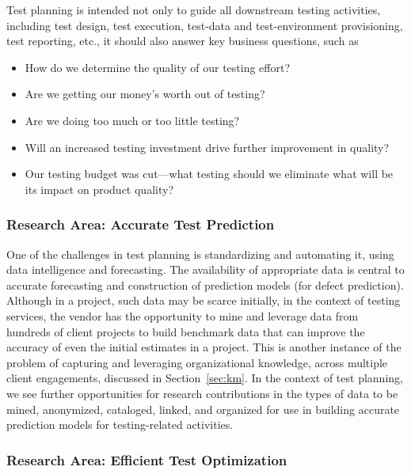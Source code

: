 Test planning is intended not only to guide all downstream testing activities,
including test design, test execution, test-data and test-environment
provisioning, test reporting, etc., it should also answer key business
questions, such as~\cite{Kagan:NextGenTesting}

\begin{itemize}
\denseitems

\item How do we determine the quality of our testing effort?

\item Are we getting our money's worth out of testing?

\item Are we doing too much or too little testing?

\item Will an increased testing investment drive further improvement in quality?

\item Our testing budget was cut---what testing should we eliminate what will be
  its impact on product quality?

\end{itemize}

\subsubsection*{Research Area: Accurate Test Prediction}

One of the challenges in test planning is standardizing and automating it, using
data intelligence and forecasting. The availability of appropriate data is
central to accurate forecasting and construction of prediction models (\eg for
defect prediction). Although in a project, such data may be scarce initially, in
the context of testing services, the vendor has the opportunity to mine and
leverage data from hundreds of client projects to build benchmark data that can
improve the accuracy of even the initial estimates in a project. This is another
instance of the problem of capturing and leveraging organizational knowledge,
across multiple client engagements, discussed in Section~\ref{sec:km}. In the
context of test planning, we see further opportunities for research
contributions in the types of data to be mined, anonymized, cataloged, linked,
and organized for use in building accurate prediction models for testing-related
activities.

\subsubsection*{Research Area: Efficient Test Optimization}

